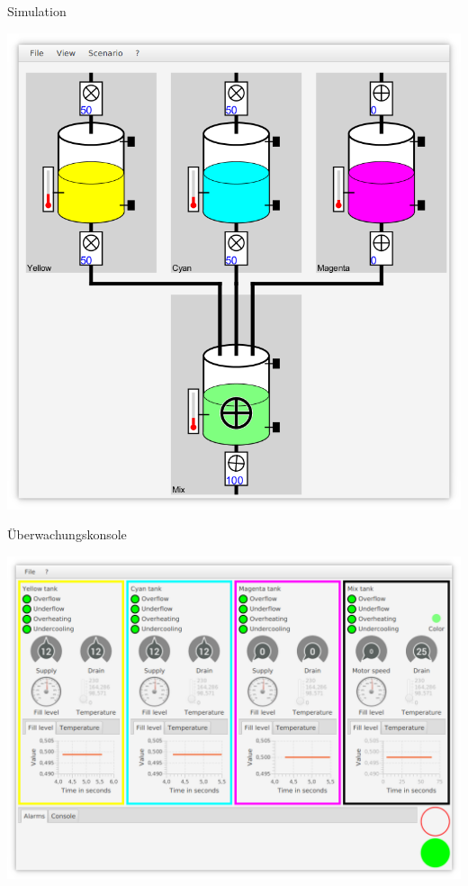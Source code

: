 \documentclass[22pt]{beamer}
\begin{document}
\begin{frame}{Simulation}
\vspace*{-3em}
 \begin{center}
 \includegraphics[height=\textheight,width=\textwidth,keepaspectratio=true]{ScreenshotSimulation.png}
 \end{center}
\end{frame}

\begin{frame}{Überwachungskonsole}
  \vspace*{-1em}
 \begin{center}
  \includegraphics[height=\textheight,width=\textwidth,keepaspectratio=true]{ScreenshotMonitor.png}
 \end{center}
\end{frame}
\end{document}
